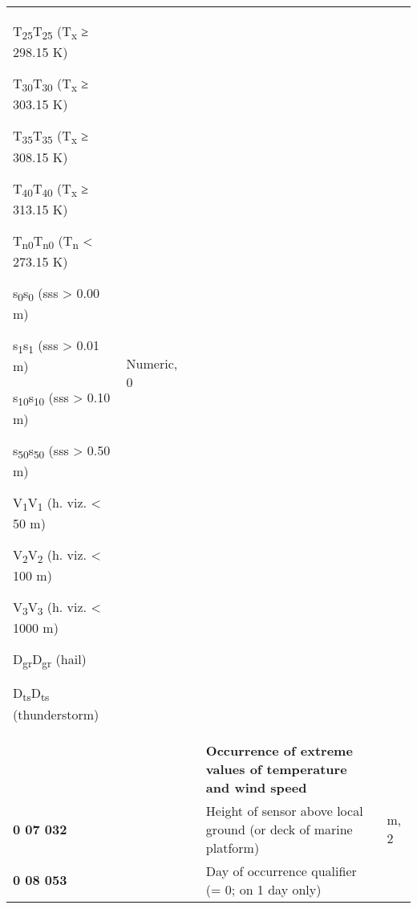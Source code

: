 \begin{longtable}[]{@{}lllll@{}}
\begin{minipage}[t]{0.17\columnwidth}
T\textsubscript{25}T\textsubscript{25} (T\textsubscript{x} ≥ 298.15 K)

T\textsubscript{30}T\textsubscript{30} (T\textsubscript{x} ≥ 303.15 K)

T\textsubscript{35}T\textsubscript{35} (T\textsubscript{x} ≥ 308.15 K)

T\textsubscript{40}T\textsubscript{40} (T\textsubscript{x} ≥ 313.15 K)

T\textsubscript{n0}T\textsubscript{n0} (T\textsubscript{n} \textless{} 273.15 K)

s\textsubscript{0}s\textsubscript{0} (sss \textgreater{} 0.00 m)

s\textsubscript{1}s\textsubscript{1} (sss \textgreater{} 0.01 m)

s\textsubscript{10}s\textsubscript{10} (sss \textgreater{} 0.10 m)

s\textsubscript{50}s\textsubscript{50} (sss \textgreater{} 0.50 m)

V\textsubscript{1}V\textsubscript{1} (h. viz. \textless{} 50 m)

V\textsubscript{2}V\textsubscript{2} (h. viz. \textless{} 100 m)

V\textsubscript{3}V\textsubscript{3} (h. viz. \textless{} 1000 m)

D\textsubscript{gr}D\textsubscript{gr} (hail)

D\textsubscript{ts}D\textsubscript{ts} (thunderstorm)\strut
\end{minipage} & \begin{minipage}[t]{0.17\columnwidth}\raggedright
Numeric, 0\strut
\end{minipage}\tabularnewline
& & & \textbf{Occurrence of extreme values of temperature and wind speed} &\tabularnewline
\textbf{0 07 032} & & & Height of sensor above local ground (or deck of marine platform) & m, 2\tabularnewline
\begin{minipage}[t]{0.17\columnwidth}\raggedright
\textbf{0 08 053}\strut
\end{minipage} & \begin{minipage}[t]{0.17\columnwidth}\raggedright
\strut
\end{minipage} & \begin{minipage}[t]{0.17\columnwidth}\raggedright
\strut
\end{minipage} & \begin{minipage}[t]{0.17\columnwidth}\raggedright
Day of occurrence qualifier (= 0; on 1 day only)


\end{minipage}
\end{longtable}
